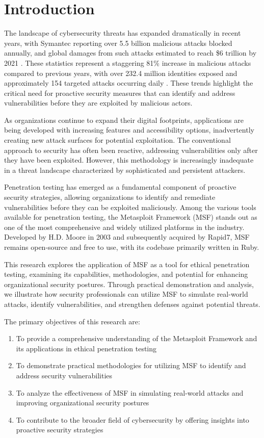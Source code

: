 \documentclass[journal,twoside]{IEEEtran}
\begin{document}
\section{Introduction}
The landscape of cybersecurity threats has expanded dramatically in recent years, with Symantec reporting over 5.5 billion malicious attacks blocked annually, and global damages from such attacks estimated to reach \$6 trillion by 2021 \cite{cybersecurity2020}. These statistics represent a staggering 81\% increase in malicious attacks compared to previous years, with over 232.4 million identities exposed and approximately 154 targeted attacks occurring daily \cite{symantec2021}. These trends highlight the critical need for proactive security measures that can identify and address vulnerabilities before they are exploited by malicious actors.

As organizations continue to expand their digital footprints, applications are being developed with increasing features and accessibility options, inadvertently creating new attack surfaces for potential exploitation. The conventional approach to security has often been reactive, addressing vulnerabilities only after they have been exploited. However, this methodology is increasingly inadequate in a threat landscape characterized by sophisticated and persistent attackers.

Penetration testing has emerged as a fundamental component of proactive security strategies, allowing organizations to identify and remediate vulnerabilities before they can be exploited maliciously. Among the various tools available for penetration testing, the Metasploit Framework (MSF) stands out as one of the most comprehensive and widely utilized platforms in the industry. Developed by H.D. Moore in 2003 and subsequently acquired by Rapid7, MSF remains open-source and free to use, with its codebase primarily written in Ruby.

This research explores the application of MSF as a tool for ethical penetration testing, examining its capabilities, methodologies, and potential for enhancing organizational security postures. Through practical demonstration and analysis, we illustrate how security professionals can utilize MSF to simulate real-world attacks, identify vulnerabilities, and strengthen defenses against potential threats.

The primary objectives of this research are:
\begin{enumerate}
    \item To provide a comprehensive understanding of the Metasploit Framework and its applications in ethical penetration testing
    \item To demonstrate practical methodologies for utilizing MSF to identify and address security vulnerabilities
    \item To analyze the effectiveness of MSF in simulating real-world attacks and improving organizational security postures
    \item To contribute to the broader field of cybersecurity by offering insights into proactive security strategies
\end{enumerate}
\end{document}
